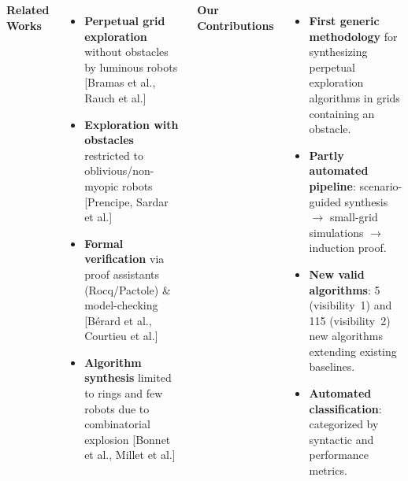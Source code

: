 \begin{frame}{}
\begin{columns}[T,totalwidth=\textwidth]


{\small\textbf{Related Works}}

\vspace{0.10cm}
{\small\begin{itemize}\setlength\itemsep{2pt}
  \item \textbf{Perpetual grid exploration} without obstacles by luminous robots
        {\footnotesize\textcolor{softgray}{[Bramas et al., Rauch et al.]}}
  \item \textbf{Exploration with obstacles} restricted to oblivious/non-myopic robots
        {\footnotesize\textcolor{softgray}{[Prencipe, Sardar et al.]}}
  \item \textbf{Formal verification} via proof assistants (Rocq/Pactole) \& model-checking
        {\footnotesize\textcolor{softgray}{[Bérard et al., Courtieu et al.]}}
  \item \textbf{Algorithm synthesis} limited to rings and few robots due to combinatorial explosion
        {\footnotesize\textcolor{softgray}{[Bonnet et al., Millet et al.]}}
\end{itemize}}


{\small\textbf{Our Contributions}}

\vspace{0.10cm}
{\small\begin{itemize}\setlength\itemsep{2pt}
  \item \textcolor{accent}{\textbf{First generic methodology}} for synthesizing perpetual exploration algorithms in grids containing an obstacle.
  \item \textcolor{accent}{\textbf{Partly automated pipeline}}: scenario-guided synthesis $\rightarrow$ small-grid simulations $\rightarrow$ induction proof.
  \item \textcolor{accent}{\textbf{New valid algorithms}}: 5 (visibility~1) and 115 (visibility~2) new algorithms extending existing baselines.
  \item \textcolor{accent}{\textbf{Automated classification}}: categorized by syntactic and performance metrics.
\end{itemize}}

\end{columns}
\end{frame}